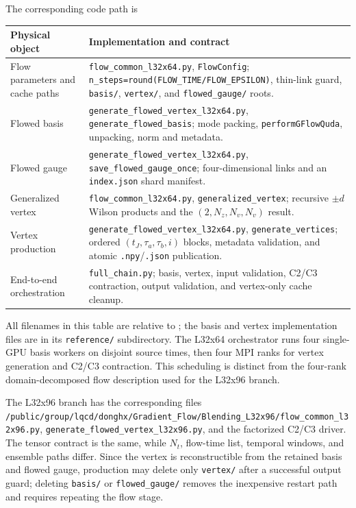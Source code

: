 \documentclass[11pt]{article}
\numberwithin{equation}{section}
\begin{document}
The corresponding code path is
\begin{center}
\begin{tabular}{>{\raggedright\arraybackslash}p{}
                >{\raggedright\arraybackslash}p{}}
\toprule
Physical object & Implementation and contract \\
\midrule
Flow parameters and cache paths
 & \texttt{flow\_common\_l32x64.py}, \texttt{FlowConfig};
 \texttt{n\_steps=round(FLOW\_TIME/FLOW\_EPSILON)}, thin-link guard,
 \texttt{basis/}, \texttt{vertex/}, and \texttt{flowed\_gauge/} roots. \\
Flowed basis
 & \texttt{generate\_flowed\_vertex\_l32x64.py},
 \texttt{generate\_flowed\_basis}; mode packing,
 \texttt{performGFlowQuda}, unpacking, norm and metadata. \\
Flowed gauge
 & \texttt{generate\_flowed\_vertex\_l32x64.py},
 \texttt{save\_flowed\_gauge\_once};
 four-dimensional links and an \texttt{index.json} shard manifest. \\
Generalized vertex
 & \texttt{flow\_common\_l32x64.py}, \texttt{generalized\_vertex};
 recursive \(\pm d\) Wilson products and the \((2,N_z,N_v,N_v)\) result. \\
Vertex production
 & \texttt{generate\_flowed\_vertex\_l32x64.py},
 \texttt{generate\_vertices};
 ordered \((t_J,\tau_a,\tau_b,i)\) blocks, metadata validation, and atomic
 \texttt{.npy}/\texttt{.json} publication. \\
End-to-end orchestration
 & \texttt{full\_chain.py}; basis, vertex,
 input validation, C2/C3 contraction, output validation, and vertex-only
 cache cleanup. \\
\bottomrule
\end{tabular}
\end{center}

All filenames in this table are relative to
;
the basis and vertex implementation files are in its \texttt{reference/}
subdirectory.  The L32x64 orchestrator runs four single-GPU basis workers on
disjoint source times, then four MPI ranks for vertex generation and C2/C3
contraction.  This scheduling is distinct from the four-rank domain-decomposed
flow description used for the L32x96 branch.

The L32x96 branch has the corresponding files
\nolinkurl{/public/group/lqcd/donghx/Gradient_Flow/Blending_L32x96/flow_common_l32x96.py},
\nolinkurl{generate_flowed_vertex_l32x96.py}, and the factorized C2/C3 driver.
The tensor contract is the same, while \(N_t\), flow-time list, temporal
windows, and ensemble paths differ.  Since the vertex is reconstructible from
the retained basis and flowed gauge, production may delete only
\texttt{vertex/} after a successful output guard; deleting \texttt{basis/} or
\texttt{flowed\_gauge/} removes the inexpensive restart path and requires
repeating the flow stage.
\end{document}
